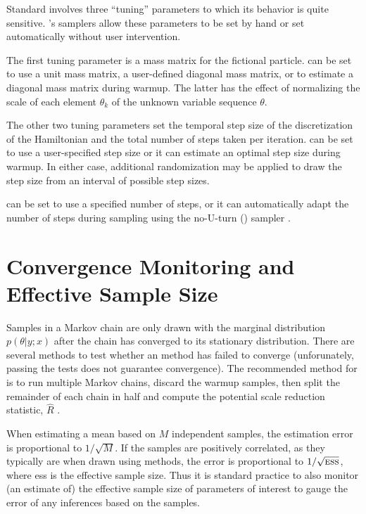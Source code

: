 Standard \HMC involves three ``tuning'' parameters to which its
behavior is quite sensitive.  \Stan's samplers allow these parameters
to be set by hand or set automatically without user intervention.

The first tuning parameter is a mass matrix for the fictional
particle.  \Stan can be set to use a unit mass matrix, a user-defined
diagonal mass matrix, or to estimate a diagonal mass matrix during
warmup.  The latter has the effect of normalizing the scale of each
element $\theta_k$ of the unknown variable sequence $\theta$.

The other two tuning parameters set the temporal step size of the
discretization of the Hamiltonian and the total number of steps taken
per iteration.  \Stan can be set to use a user-specified step size
or it can estimate an optimal step size during warmup.  In either case,
additional randomization may be applied to draw the step size from
an interval of possible step sizes.  

\Stan can be set to use a specified number of steps, or it can
automatically adapt the number of steps during sampling using the
no-U-turn (\NUTS) sampler \citep{Hoffman-Gelman:2012}.  


\section{Convergence Monitoring and Effective Sample Size}

Samples in a Markov chain are only drawn with the marginal
distribution $p(\theta|y;x)$ after the chain has converged to its
stationary distribution.  There are several methods to test whether an
\MCMC method has failed to converge (unforunately, passing the tests
does not guarantee convergence).  The recommended method for \Stan is to
run multiple Markov chains, discard the warmup samples, then split the
remainder of each chain in half and compute the potential scale
reduction statistic, $\hat{R}$ \citep{GelmanRubin:1992}.

When estimating a mean based on $M$ independent samples, the
estimation error is proportional to $1/\sqrt{M}$.  If the samples are
positively correlated, as they typically are when drawn using \MCMC
methods, the error is proportional to $1/\sqrt{\mbox{\sc ess}}$, where
{\sc ess} is the effective sample size.  Thus it is standard practice
to also monitor (an estimate of) the effective sample size of
parameters of interest to gauge the error of any inferences based on
the samples.




